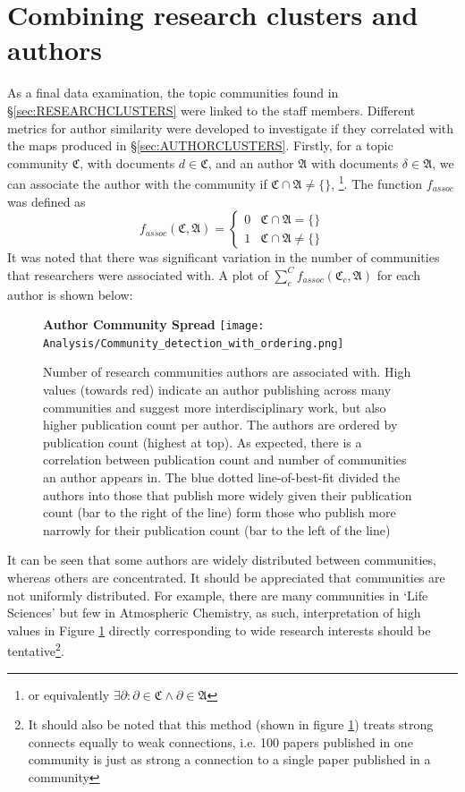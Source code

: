 \section{Combining research clusters and authors}
As a final data examination, the topic communities found in  \S\ref{sec:RESEARCHCLUSTERS} were linked to the staff members. Different metrics for author similarity were developed to investigate if they correlated with the maps produced in \S\ref{sec:AUTHORCLUSTERS}.
Firstly, for a topic community $\mathfrak{C}$, with documents $d \in \mathfrak{C}$, and an author $\mathfrak{A}$ with documents $\delta \in \mathfrak{A}$, we can associate the author with the community if $\mathfrak{C} \cap \mathfrak{A} \neq \{ \}$, \footnote{or equivalently $\exists  \partial : \partial \in \mathfrak{C} \wedge \partial \in \mathfrak{A} $}. The function $f_{assoc}$ was defined as 
\[ 
f_{assoc}\left( \mathfrak{C} , \mathfrak{A} \right) = \begin{cases} 
      0 & \mathfrak{C} \cap \mathfrak{A} = \{ \} \\
      1 & \mathfrak{C} \cap \mathfrak{A} \neq \{ \} 
   \end{cases}
\]
It was noted that there was significant variation in the number of communities that researchers were associated with. A plot of $\sum_c^C f_{assoc} \left( \mathfrak{C}_c , \mathfrak{A} \right)$ for each author is shown below:
\begin{center}
\begin{figure}[H]
  \centering
  \textbf{Author Community Spread}
    \texttt{[image: Analysis/Community\_detection\_with\_ordering.png]}
    \caption[Author community Spread]{Number of research communities authors are associated with. High values (towards red) indicate an author publishing across many communities and suggest more interdisciplinary work, but also higher publication count per author. The authors are ordered by publication count (highest at top). As expected, there is a correlation between publication count and number of communities an author appears in. The blue dotted line-of-best-fit divided the authors into those that publish more widely given their publication count (bar to the right of the line) form those who publish more narrowly for their publication count (bar to the left of the line)}
\label{fig:commbar}

\end{figure} 
\end{center}
It can be seen that some authors are widely distributed between communities, whereas others are concentrated.
It should be appreciated that communities are not uniformly distributed. For example, there are many communities in `Life Sciences' but few in Atmospheric Chemistry, as such, interpretation of high values in Figure \ref{fig:commbar} directly corresponding to wide research interests should be tentative\footnote{It should also be noted that this method (shown in figure \ref{fig:commbar}) treats strong connects equally to weak connections, i.e. 100 papers published in one community is just as strong a connection to a single paper published in a community}.

